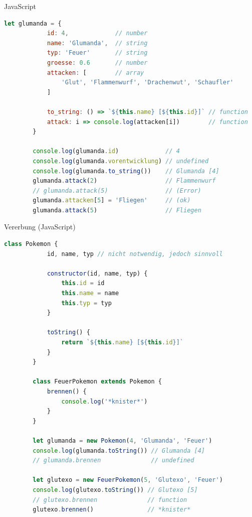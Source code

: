 \begin{example}{JavaScript}
    \begin{lstlisting}[language=JavaScript]
        let glumanda = {
            id: 4,             // number
            name: 'Glumanda',  // string
            typ: 'Feuer'       // string
            groesse: 0.6       // number
            attacken: [        // array
                'Glut', 'Flammenwurf', 'Drachenwut', 'Schaufler'
            ]

            to_string: () => `${this.name} [${this.id}]` // function
            attack: i => console.log(attacken[i])        // function
        }

        console.log(glumanda.id)             // 4
        console.log(glumanda.vorentwicklung) // undefined
        console.log(glumanda.to_string())    // Glumanda [4]
        glumanda.attack(2)                   // Flammenwurf
        // glumanda.attack(5)                // (Error)
        glumanda.attacken[5] = 'Fliegen'     // (ok)
        glumanda.attack(5)                   // Fliegen
    \end{lstlisting}
\end{example}

\begin{example}{Vererbung (JavaScript)}
    \begin{lstlisting}[language=JavaScript]
        class Pokemon {
            id, name, typ // nicht notwendig, jedoch sinnvoll

            constructor(id, name, typ) {
                this.id = id
                this.name = name
                this.typ = typ
            }

            toString() {
                return `${this.name} [${this.id}]`
            }
        }

        class FeuerPokemon extends Pokemon {
            brennen() {
                console.log('*knister*')
            }
        }

        let glumanda = new Pokemon(4, 'Glumanda', 'Feuer')
        console.log(glumanda.toString()) // Glumanda [4]
        // glumanda.brennen              // undefined

        let glutexo = new FeuerPokemon(5, 'Glutexo', 'Feuer')
        console.log(glutexo.toString()) // Glutexo [5]
        // glutexo.brennen              // function
        glutexo.brennen()               // *knister*
    \end{lstlisting}
\end{example}

